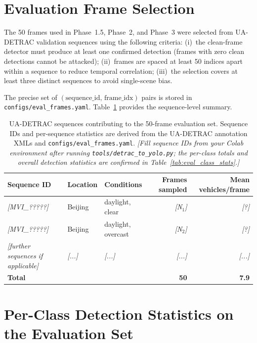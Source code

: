 \documentclass[12pt,a4paper]{report}
\begin{document}
\section{Evaluation Frame Selection}

The 50 frames used in Phase~1.5, Phase~2, and Phase~3 were selected
from UA-DETRAC validation sequences using the following criteria:
(i)~the clean-frame detector must produce at least one confirmed
detection (frames with zero clean detections cannot be attacked);
(ii)~frames are spaced at least 50 indices apart within a sequence to
reduce temporal correlation; (iii)~the selection covers at least three
distinct sequences to avoid single-scene bias.

The precise set of $(\text{sequence\_id},\,\text{frame\_idx})$ pairs is
stored in \texttt{configs/eval\_frames.yaml}.
Table~\ref{tab:sequence_catalogue} provides the sequence-level
summary.

\begin{table}[htbp]
  \centering
  \caption{UA-DETRAC sequences contributing to the 50-frame evaluation
           set.  Sequence IDs and per-sequence statistics are derived from
           the UA-DETRAC annotation XMLs and
           \texttt{configs/eval\_frames.yaml}.
           \textit{[Fill sequence IDs from your Colab environment after
           running \texttt{tools/detrac\_to\_yolo.py}; the per-class totals
           and overall detection statistics are confirmed in
           Table~\ref{tab:eval_class_stats}.]}}
  \label{tab:sequence_catalogue}
  \small
  \begin{tabular}{@{}lllrr@{}}
    \toprule
    Sequence ID & Location & Conditions
      & Frames sampled & Mean vehicles/frame \\
    \midrule
    \textit{[MVI\_?????]} & Beijing & daylight, clear  & \textit{[N$_1$]} & \textit{[?]}\\
    \textit{[MVI\_?????]} & Beijing & daylight, overcast & \textit{[N$_2$]} & \textit{[?]}\\
    \textit{[further sequences if applicable]}
              & \textit{[...]} & \textit{[...]} & \textit{[...]} & \textit{[...]}\\
    \midrule
    \textbf{Total} & & & \textbf{50} & \textbf{7.9}\\
    \bottomrule
  \end{tabular}
\end{table}

\section{Per-Class Detection Statistics on the Evaluation Set}
\end{document}
